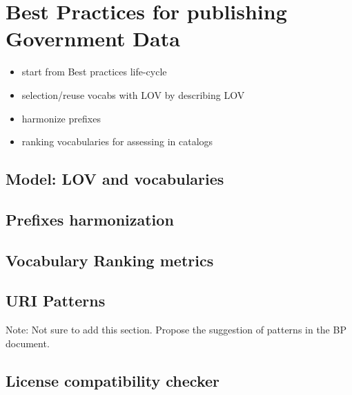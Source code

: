\chapter{Best Practices for publishing Government Data}
\label{ch:ch6}

\begin{itemize}
\item start from Best practices life-cycle
\item selection/reuse vocabs with LOV by describing LOV
\item harmonize prefixes
\item ranking vocabularies for assessing in catalogs
\end{itemize}


\section{Model: LOV and vocabularies}
\label{sec:lov}

\section{Prefixes harmonization}
\label{sec:prefharmoni}

\section{Vocabulary Ranking metrics}
\label{sec:vocabranking}

\section{URI Patterns}
\label{sec:uris}

Note: Not sure to add this section. Propose the suggestion of patterns in the BP document.

\section{License compatibility checker}
\label{sec:checker}

